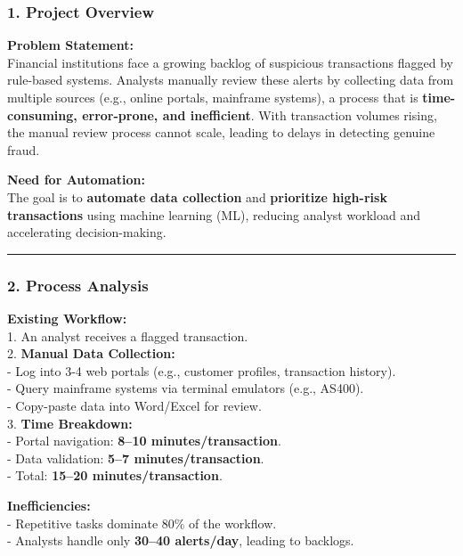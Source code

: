 \documentclass[
]{article}
\author{}
\date{}
\begin{document}
\subsubsection{\texorpdfstring{\textbf{1. Project
Overview}}{1. Project Overview}}\label{project-overview}

\textbf{Problem Statement:}\\
Financial institutions face a growing backlog of suspicious transactions
flagged by rule-based systems. Analysts manually review these alerts by
collecting data from multiple sources (e.g., online portals, mainframe
systems), a process that is \textbf{time-consuming, error-prone, and
inefficient}. With transaction volumes rising, the manual review process
cannot scale, leading to delays in detecting genuine fraud.

\textbf{Need for Automation:}\\
The goal is to \textbf{automate data collection} and \textbf{prioritize
high-risk transactions} using machine learning (ML), reducing analyst
workload and accelerating decision-making.

\begin{center}\rule{0.5\linewidth}{0.5pt}\end{center}

\subsubsection{\texorpdfstring{\textbf{2. Process
Analysis}}{2. Process Analysis}}\label{process-analysis}

\textbf{Existing Workflow:}\\
1. An analyst receives a flagged transaction.\\
2. \textbf{Manual Data Collection:}\\
- Log into 3-4 web portals (e.g., customer profiles, transaction
history).\\
- Query mainframe systems via terminal emulators (e.g., AS400).\\
- Copy-paste data into Word/Excel for review.\\
3. \textbf{Time Breakdown:}\\
- Portal navigation: \textbf{8--10 minutes/transaction}.\\
- Data validation: \textbf{5--7 minutes/transaction}.\\
- Total: \textbf{15--20 minutes/transaction}.

\textbf{Inefficiencies:}\\
- Repetitive tasks dominate 80\% of the workflow.\\
- Analysts handle only \textbf{30--40 alerts/day}, leading to backlogs.
\end{document}
